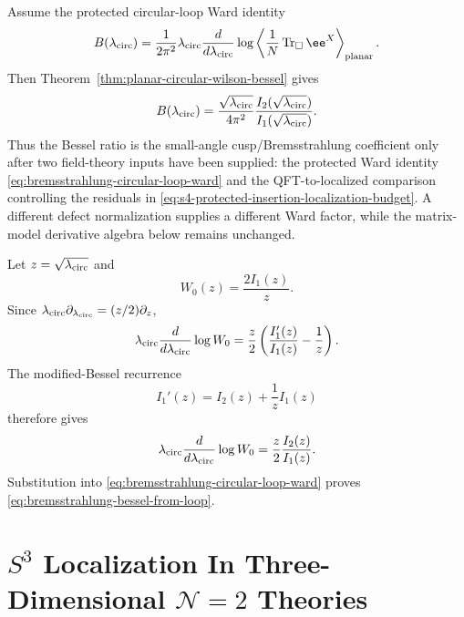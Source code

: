 \begin{remark}
\label{rem:bremsstrahlung-derivative-algebra}
Assume the protected circular-loop Ward identity
\begin{equation}
  B(\lambda_{\rm circ})
  =
  \frac{1}{2\pi^2}
  \lambda_{\rm circ}\frac{d}{d\lambda_{\rm circ}}
  \log
  \left\langle
    \frac1N\operatorname{Tr}_{\square}\ee^X
  \right\rangle_{\rm planar}.
  \label{eq:bremsstrahlung-circular-loop-ward}
\end{equation}
Then Theorem~\ref{thm:planar-circular-wilson-bessel} gives
\begin{equation}
  B(\lambda_{\rm circ})
  =
  \frac{\sqrt{\lambda_{\rm circ}}}{4\pi^2}
  \frac{I_2(\sqrt{\lambda_{\rm circ}})}
       {I_1(\sqrt{\lambda_{\rm circ}})} .
  \label{eq:bremsstrahlung-bessel-from-loop}
\end{equation}
Thus the Bessel ratio is the small-angle cusp/Bremsstrahlung coefficient only
after two field-theory inputs have been supplied: the protected Ward identity
\eqref{eq:bremsstrahlung-circular-loop-ward} and the QFT-to-localized
comparison controlling the residuals in
\eqref{eq:s4-protected-insertion-localization-budget}.  A different defect
normalization supplies a different Ward factor, while the matrix-model
derivative algebra below remains unchanged.

Let \(z=\sqrt{\lambda_{\rm circ}}\) and
\[
  W_0(z)=\frac{2I_1(z)}{z}.
\]
Since \(\lambda_{\rm circ}\partial_{\lambda_{\rm circ}}
=(z/2)\partial_z\),
\[
  \lambda_{\rm circ}\frac{d}{d\lambda_{\rm circ}}\log W_0
  =
  \frac z2
  \left(
    \frac{I_1'(z)}{I_1(z)}-\frac1z
  \right).
\]
The modified-Bessel recurrence
\begin{equation}
  I_1'(z)=I_2(z)+\frac1z I_1(z)
  \label{eq:bessel-i1-derivative-recurrence}
\end{equation}
therefore gives
\begin{equation}
  \lambda_{\rm circ}\frac{d}{d\lambda_{\rm circ}}\log W_0
  =
  \frac z2\frac{I_2(z)}{I_1(z)} .
  \label{eq:circular-loop-log-derivative-bessel}
\end{equation}
Substitution into \eqref{eq:bremsstrahlung-circular-loop-ward} proves
\eqref{eq:bremsstrahlung-bessel-from-loop}.
\end{remark}

\section{\texorpdfstring
  {\(S^3\) Localization In Three-Dimensional \(\mathcal N=2\) Theories}
  {S3 Localization In Three-Dimensional N=2 Theories}}

